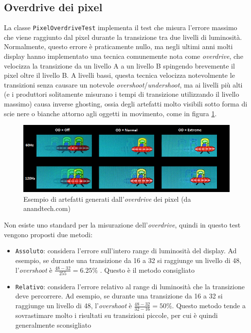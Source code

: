 \subsection{Overdrive dei pixel}
La classe \texttt{PixelOverdriveTest} implementa il test che misura l'errore massimo che viene raggiunto dal pixel durante la transizione tra due livelli di luminosità. Normalmente, questo errore è praticamente nullo, ma negli ultimi anni molti display hanno implementato una tecnica comunemente nota come \textit{overdrive}, che velocizza la transizione da un livello A a un livello B spingendo brevemente il pixel oltre il livello B. A livelli bassi, questa tecnica velocizza notevolmente le transizioni senza causare un notevole \textit{overshoot}/\textit{undershoot}, ma ai livelli più alti (e i produttori solitamente misurano i tempi di transizione utilizzando il livello massimo) causa inverse ghosting, ossia degli artefatti molto visibili sotto forma di scie nere o bianche attorno agli oggetti in movimento, come in figura \ref{fig:overdrive_ufotest}.
\begin{figure}[H]
	\centering
	\includegraphics[width=\textwidth]{Applicazione_files/overdrive_ufotest.png}
	\caption{Esempio di artefatti generati dall'\textit{overdrive} dei pixel (da anandtech.com)}
	\label{fig:overdrive_ufotest}
\end{figure}

Non esiste uno standard per la misurazione dell'\textit{overdrive}, quindi in questo test vengono proposti due metodi:\begin{itemize}
	\item \texttt{Assoluto}: considera l'errore sull'intero range di luminosità del display. Ad esempio, se durante una transizione da 16 a 32 si raggiunge un livello di 48, l'\textit{overshoot} è ${\frac{48-32}{255}=6.25\%}$ . Questo è il metodo consigliato
	\item \texttt{Relativo}: considera l'errore relativo al range di luminosità che la transizione deve percorrere. Ad esempio, se durante una transizione da 16 a 32 si raggiunge un livello di 48, l'\textit{overshoot} è  ${\frac{48-32}{32-16}=50\%}$. Questo metodo tende a sovrastimare molto i risultati su transizioni piccole, per cui è quindi generalmente sconsigliato
\end{itemize}

